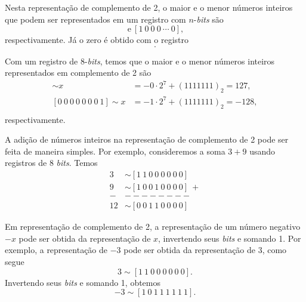 
Nesta representação de complemento de 2, o maior e o menor números inteiros que podem ser representados em um registro com $n$-{\it bits} são
\begin{equation}
  [1 ~ 1 ~ 1 ~ \cdots ~ 1 ~ 0] ~ \text{e} ~ [1 ~ 0 ~ 0 ~ 0 ~ \cdots ~ 0],
\end{equation}
respectivamente. Já o zero é obtido com o registro
\begin{equation}
  [0 ~ 0 ~ 0 ~ 0 ~ 0 ~ 0 ~ 0 ~ 0].
\end{equation}

\begin{ex}
  Com um registro de $8$-{\it bits}, temos que o maior e o menor números inteiros representados em complemento de 2 são
  \begin{align}
    [1 ~ 1 ~ 1 ~ 1 ~ 1 ~ 1 ~ 1 ~ 0] \sim x &= -0\cdot 2^7 + (1111111)_2 = 127,\\
    [0 ~ 0 ~ 0 ~ 0 ~ 0 ~ 0 ~ 0 ~ 1] \sim x &= -1\cdot 2^7 + (1111111)_2 = -128,\\
  \end{align}
  respectivamente.  
\end{ex}

A adição de números inteiros na representação de complemento de 2 pode ser feita de maneira simples. Por exemplo, consideremos a soma $3 + 9$ usando registros de 8 {\it bits}. Temos
\begin{align}
  3 &\sim [1 ~ 1 ~ 0 ~ 0 ~ 0 ~ 0 ~ 0 ~ 0]\\
  9 &\sim [1 ~ 0 ~ 0 ~ 1 ~ 0 ~ 0 ~ 0 ~ 0] ~ + \\
  - & -------- \\
 12 &\sim [0 ~ 0 ~ 1 ~ 1 ~ 0 ~ 0 ~ 0 ~ 0]
\end{align}

Em representação de complemento de 2, a representação de um número negativo $-x$ pode ser obtida da representação de $x$, invertendo seus {\it bits} e somando 1. Por exemplo, a representação de $-3$ pode ser obtida da representação de $3$, como segue
\begin{equation}
  3 \sim [1 ~ 1 ~ 0 ~ 0 ~ 0 ~ 0 ~ 0 ~ 0].
\end{equation}
Invertendo seus {\it bits} e somando 1, obtemos
\begin{equation}
  -3 \sim [1 ~ 0 ~ 1 ~ 1 ~ 1 ~ 1 ~ 1 ~ 1].
\end{equation}

